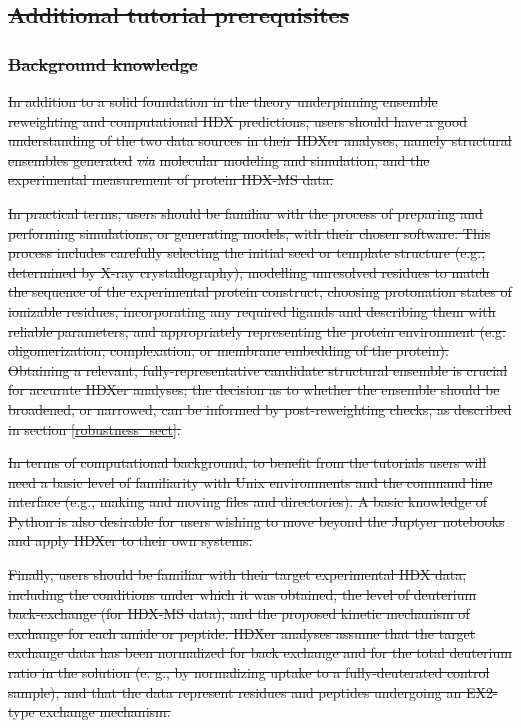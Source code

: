 \documentclass[9pt,tutorial]{livecoms}
\providecommand{\DIFdel}[1]{{\protect\color{red}\sout{#1}}}                      %
\providecommand{\DIFdelbegin}{} %
\begin{document}
\DIFdelbegin \subsection{\DIFdel{Additional tutorial prerequisites}}
\addtocounter{subsection}{-1}%
\subsubsection{\DIFdel{Background knowledge}}
\addtocounter{subsubsection}{-1}%
\DIFdel{In addition to a solid foundation in the theory underpinning ensemble reweighting and computational HDX predictions, users should have a good understanding of the two data sources in their HDXer analyses, namely structural ensembles generated }\textit{\DIFdel{via}} %
\DIFdel{molecular modeling and simulation, and the experimental measurement of protein HDX-MS data.
}%

\DIFdel{In practical terms, users should be familiar with the process of preparing and performing simulations, or generating models, with their chosen software. 
This process includes carefully selecting the initial seed or template structure (e.g., determined by X-ray crystallography), modelling unresolved residues to match the sequence of the experimental protein construct, choosing protonation states of ionizable residues, incorporating any required ligands and describing them with reliable parameters, and appropriately representing the protein environment (e.g. oligomerization, complexation, or membrane embedding of the protein).
Obtaining a relevant, fully-representative candidate structural ensemble is crucial for accurate HDXer analyses; the decision as to whether the ensemble should be broadened, or narrowed, can be informed by post-reweighting checks, as described in section \ref{robustness_sect}.
}%

\DIFdel{In terms of computational background, to benefit from the tutorials users will need a basic level of familiarity with Unix environments and the command line interface (e.g., making and moving files and directories).
A basic knowledge of Python is also desirable for users wishing to move beyond the Juptyer notebooks and apply HDXer to their own systems. 
}%

\DIFdel{Finally, users should be familiar with their target experimental HDX data, including the conditions under which it was obtained, the level of deuterium back-exchange (for HDX-MS data), and the proposed kinetic mechanism of exchange for each amide or peptide.
HDXer analyses assume that the target exchange data has been normalized for back exchange and for the total deuterium ratio in the solution (e.
g., by normalizing uptake to a fully-deuterated control sample), and that the data represent residues and peptides undergoing an EX2-type exchange mechanism.
}%
\end{document}
